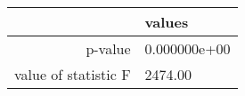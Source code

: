 \begin{tabular}{|r|l|}
  \hline
    & values \\
  \hline
  p-value & 0.000000e+00 \\
  \hline
  value of statistic F & 2474.00 \\
  \hline
\end{tabular}
